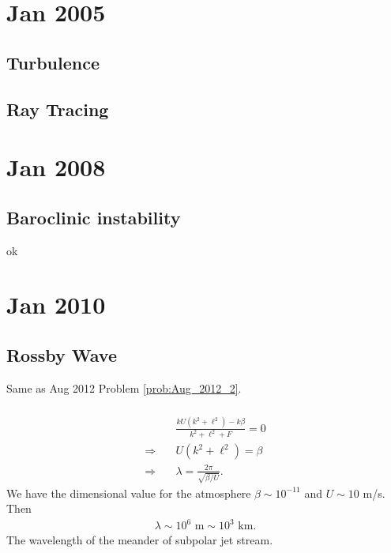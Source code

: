 \documentclass[11pt,letterpaper]{book}
\theoremstyle{definition}
\newcommand{\thus}{\Rightarrow \quad }
\begin{document}
\chapter{Jan 2005}
\section{Turbulence}

\section{Ray Tracing}


\chapter{Jan 2008}
\section{Baroclinic instability}
ok


\chapter{Jan 2010}
\section{Rossby Wave}
Same as Aug 2012 Problem \ref{prob:Aug_2012_2}.
\subsection{}

\subsection{}\label{prob:jan_2010_1_b}

\subsection{}
\begin{align*}
&\frac{kU(k^2+\ell^2)-k\beta}{k^2+\ell^2+F} = 0\\
\thus &U(k^2+\ell^2) = \beta\\
\thus &\lambda = \frac{2\pi}{\sqrt{{\beta}/{U}}}.
\end{align*}
We have the dimensional value for the atmosphere $\beta \sim 10^{-11}$ and $U\sim 10$ m/s. Then
\begin{align*}
\lambda\sim 10^6\text{ m}\sim 10^3\text{ km}.
\end{align*}
The wavelength of the meander of subpolar jet stream.
\end{document}
